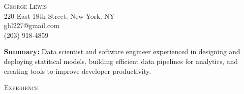 \documentclass[9pt]{article}
\newenvironment{changemargin}[2]{%
  \begin{list}{}{%
    \setlength{\topsep}{0pt}%
    \setlength{\leftmargin}{#1}%
    \setlength{\rightmargin}{#2}%
    \setlength{\listparindent}{\parindent}%
    \setlength{\itemindent}{\parindent}%
    \setlength{\parsep}{\parskip}%
  }%
  \item[]}{\end{list}
}
\newcommand{\lineover}{
  \begin{changemargin}{-0.05in}{-0.05in}
    \vspace*{-8pt}
    \hrulefill \\
    \vspace*{-2pt}
  \end{changemargin}
}
\newcommand{\header}[1]{
  \begin{changemargin}{-0.5in}{-0.5in}
    \scshape{#1}
    \lineover
  \end{changemargin}
}
\newcommand{\contact}[4]{
  \begin{changemargin}{-0.5in}{-0.5in}
    \begin{center}
      {\Large \scshape {#1}} \\ \smallskip
      {#2} \\ \smallskip
      {#3} \\ \smallskip
      {#4} \\ \smallskip
    \end{center}
  \end{changemargin}
}
\newenvironment{body} {
  \vspace*{-16pt}
\begin{changemargin}{-0.25in}{-0.5in}
  }
{\end{changemargin}
}
\begin{document}
\contact{George Lewis}
        {220 East 18th Street, New York, NY}
        {ghl227@gmail.com}
        {(203) 918-4859}
\smallskip

\begin{body}
  \vspace{14pt}
  \textbf{Summary:}{} Data scientist and software engineer experienced in designing and deploying statitical models, building efficient data pipelines for analytics, and creating tools to improve developer productivity.

\end{body}

\smallskip

\header{Experience}
\end{document}
